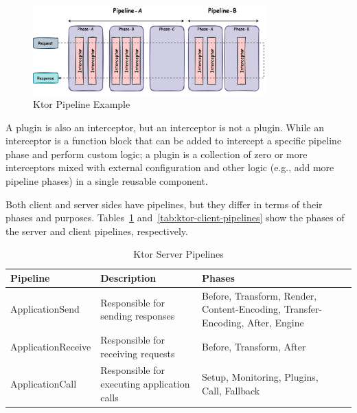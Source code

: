 \begin{figure}[!htb]
    \centering
    \includegraphics[width=0.8\textwidth]{../figures/03_ktor-pipeline}
    \caption{Ktor Pipeline Example}
    \label{fig:ktor-pipeline}
\end{figure}

A plugin is also an interceptor, but an interceptor is not a plugin.
While an interceptor is a function block that can be added to intercept a specific pipeline phase and perform custom logic; a plugin is a collection of zero or more interceptors mixed with external configuration and other logic (e.g., add more pipeline phases) in a single reusable component.

Both client and server sides have pipelines, but they differ in terms of their phases and purposes.
Tables~\ref{tab:ktor-server-pipelines} and~\ref{tab:ktor-client-pipelines} show the phases of the server and client pipelines, respectively.

\begin{table}[!htb]
    \centering
    \caption{Ktor Server Pipelines}
    \label{tab:ktor-server-pipelines}
    \vspace{0.3cm}
    \begin{tabular}{|l|p{6cm}|p{5cm}|p{5cm}|}
        \hline
        \textbf{Pipeline}  & \textbf{Description}                        & \textbf{Phases}                                                               \\ \hline
        ApplicationSend    & Responsible for sending responses           & Before, Transform, Render, Content-Encoding, Transfer-Encoding, After, Engine \\ \hline
        ApplicationReceive & Responsible for receiving requests          & Before, Transform, After                                                      \\ \hline
        ApplicationCall    & Responsible for executing application calls & Setup, Monitoring, Plugins, Call, Fallback                                    \\ \hline
    \end{tabular}
\end{table}

